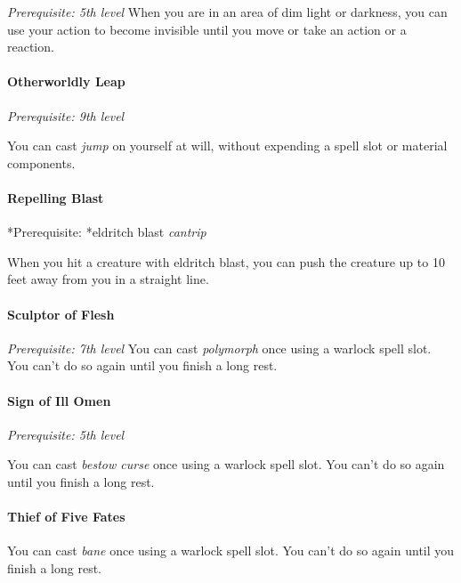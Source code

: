 \documentclass[
]{article}
\begin{document}
\emph{Prerequisite: 5th level} When you are in an area of dim light or
darkness, you can use your action to become invisible until you move or
take an action or a reaction.

\hypertarget{otherworldly-leap}{%
\paragraph{Otherworldly Leap}\label{otherworldly-leap}}

\emph{Prerequisite: 9th level}

You can cast \emph{jump} on yourself at will, without expending a spell
slot or material components.

\hypertarget{repelling-blast}{%
\paragraph{Repelling Blast}\label{repelling-blast}}

*Prerequisite: *eldritch blast \emph{cantrip}

When you hit a creature with eldritch blast, you can push the creature
up to 10 feet away from you in a straight line.

\hypertarget{sculptor-of-flesh}{%
\paragraph{Sculptor of Flesh}\label{sculptor-of-flesh}}

\emph{Prerequisite: 7th level} You can cast \emph{polymorph} once using
a warlock spell slot. You can't do so again until you finish a long
rest.

\hypertarget{sign-of-ill-omen}{%
\paragraph{Sign of Ill Omen}\label{sign-of-ill-omen}}

\emph{Prerequisite: 5th level}

You can cast \emph{bestow curse} once using a warlock spell slot. You
can't do so again until you finish a long rest.

\hypertarget{thief-of-five-fates}{%
\paragraph{Thief of Five Fates}\label{thief-of-five-fates}}

You can cast \emph{bane} once using a warlock spell slot. You can't do
so again until you finish a long rest.
\end{document}
